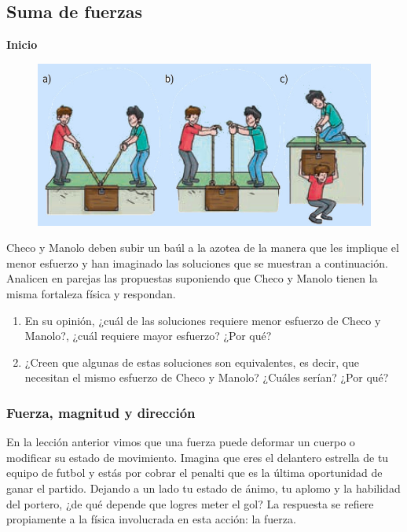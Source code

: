 \documentclass[11pt]{book}
\begin{document}
\subsection{Suma de fuerzas}
\begin{boxK}
    \begin{center}\bfseries\color{colorrds}\large Inicio\end{center}
    \begin{figure}[H]
        \centering
        \includegraphics[width=0.8\linewidth]{subir.jpg}
    \end{figure}%
    Checo y Manolo deben subir un baúl a la azotea de la manera que les implique el menor esfuerzo
    y han imaginado las soluciones que se muestran a continuación.
    Analicen en parejas las propuestas suponiendo que Checo y Manolo tienen la misma fortaleza
    física y respondan.
    \begin{enumerate}
        \item En su opinión, ¿cuál de las soluciones requiere menor esfuerzo de Checo y Manolo?,
              ¿cuál requiere mayor esfuerzo? ¿Por qué?
        \item ¿Creen que algunas de estas soluciones son equivalentes, es decir, que necesitan el
              mismo esfuerzo de Checo y Manolo? ¿Cuáles serían? ¿Por qué?
    \end{enumerate}
\end{boxK}

\subsubsection{Fuerza, magnitud y dirección}
En la lección anterior vimos que una fuerza puede deformar un cuerpo o modificar su estado de
movimiento. Imagina que eres el delantero estrella de tu equipo de futbol y estás por cobrar
el penalti que es la última oportunidad de ganar el partido. Dejando a un lado tu estado de
ánimo, tu aplomo y la habilidad del portero, ¿de qué depende que logres meter el gol?
La respuesta se refiere propiamente a la física involucrada en esta acción: la fuerza.
\end{document}
